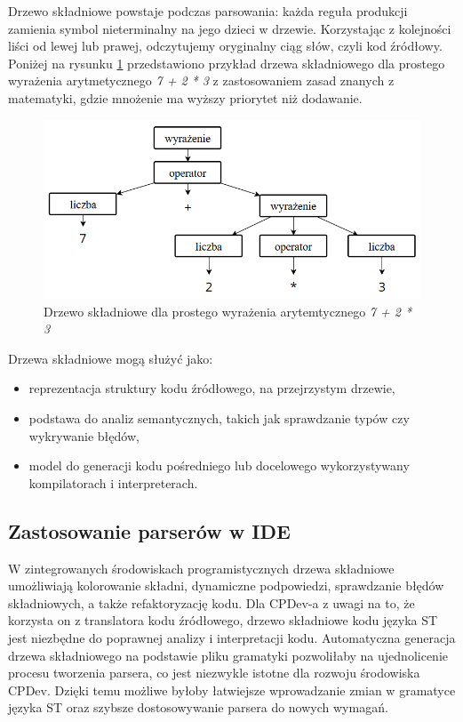 \documentclass[12pt,twoside]{article}
\begin{document}
Drzewo składniowe powstaje podczas parsowania: każda reguła produkcji zamienia symbol nieterminalny na jego dzieci w drzewie. Korzystając z kolejności liści od lewej lub prawej, odczytujemy oryginalny ciąg słów, czyli kod źródłowy. Poniżej na rysunku \ref{Fig:simpleGrammarTree} przedstawiono przykład drzewa składniowego dla prostego wyrażenia arytmetycznego \textit{7 + 2 * 3} z zastosowaniem zasad znanych z matematyki, gdzie mnożenie ma wyższy priorytet niż dodawanie.

\begin{figure}[ht]
   \centering
   \includegraphics[width=15cm]{images/grammarTreeSimple.png}
   \caption{Drzewo składniowe dla prostego wyrażenia arytemtycznego \textit{7 + 2 * 3}}
   \label{Fig:simpleGrammarTree}
\end{figure}


Drzewa składniowe mogą służyć jako:
\begin{itemize}[label=\textbullet, leftmargin=1.25cm]
   \item reprezentacja struktury kodu źródłowego, na przejrzystym drzewie,
   \item podstawa do analiz semantycznych, takich jak sprawdzanie typów czy wykrywanie błędów,
   \item model do generacji kodu pośredniego lub docelowego wykorzystywany kompilatorach i interpreterach.
\end{itemize}

\subsection{Zastosowanie parserów w IDE}
W zintegrowanych środowiskach programistycznych drzewa składniowe umożliwiają kolorowanie składni, dynamiczne podpowiedzi, sprawdzanie błędów składniowych, a także refaktoryzację kodu. Dla CPDev-a z uwagi na to, że korzysta on z translatora kodu źródłowego, drzewo składniowe kodu języka ST jest niezbędne do poprawnej analizy i interpretacji kodu. Automatyczna generacja drzewa składniowego na podstawie pliku gramatyki pozwoliłaby na ujednolicenie procesu tworzenia parsera, co jest niezwykle istotne dla rozwoju środowiska CPDev. Dzięki temu możliwe byłoby łatwiejsze wprowadzanie zmian w gramatyce języka ST oraz szybsze dostosowywanie parsera do nowych wymagań.
\clearpage
\end{document}
